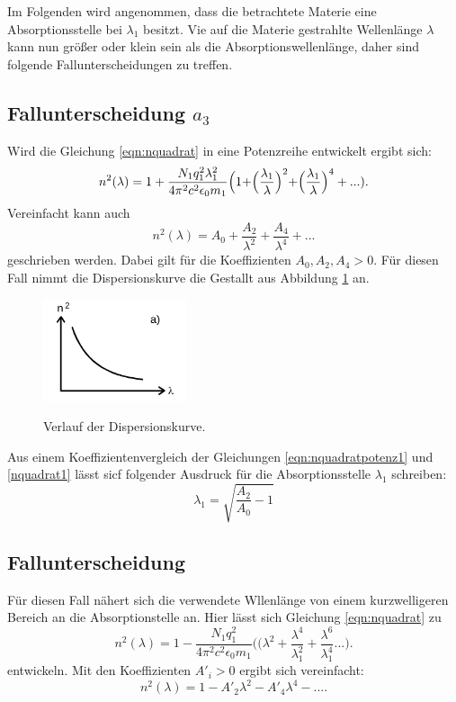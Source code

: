 Im Folgenden wird angenommen, dass die betrachtete Materie eine Absorptionsstelle
bei $\lambda_1$ besitzt. Vie auf die Materie gestrahlte Wellenlänge $\lambda$
kann nun größer oder klein sein als die Absorptionswellenlänge, daher sind
folgende Fallunterscheidungen zu treffen.

\subsection{Fallunterscheidung $a_3$} %
Wird die Gleichung \ref{eqn:nquadrat} in eine Potenzreihe entwickelt ergibt
sich:
\begin{equation}
  n^2(\lambda)=1+\frac{N_1 q^{2}_1 \lambda_{1}^{2}}{4\pi^2c^2\epsilon_0 m_1}
  \Bigr(1+\Bigr(\frac{\lambda_1}{\lambda}\Bigl)^2 +\Bigl(\frac{\lambda_1}{\lambda}\Bigr)^4+...).
  \label{eqn:nquadratpotenz1}
\end{equation}
Vereinfacht kann auch
\begin{equation}
 n^2(\lambda)= A_0+\frac{A_2}{\lambda^2}+\frac{A_4}{\lambda^4}+...
 \label{eqn:nquadrat1}
\end{equation}
geschrieben werden.
Dabei gilt für die Koeffizienten $A_0,A_2,A_4>0$.
Für diesen Fall nimmt die Dispersionskurve die Gestallt aus
Abbildung \ref{fig:krumminnen} an.

\begin{figure}[H]
  \centering
  \includegraphics[height=3cm]{n1.png}
  \caption{Verlauf der Dispersionskurve.}
  \label{fig:krumminnen}
  \cite{skript}
\end{figure}

Aus einem Koeffizientenvergleich der Gleichungen \ref{eqn:nquadratpotenz1}
und \ref{nquadrat1} lässt sicf folgender Ausdruck für die
Absorptionsstelle $\lambda_1$ schreiben:
\begin{equation}
  \lambda_1=\sqrt{\frac{A_2}{A_0}-1}
  \label{absorption}
\end{equation}

\subsection{Fallunterscheidung}%
Für diesen Fall nähert sich die verwendete Wllenlänge von einem kurzwelligeren
Bereich an die Absorptionstelle an. Hier lässt sich Gleichung
\ref{eqn:nquadrat} zu
\begin{equation}
  n^2(\lambda)=1-\frac{N_1 q^{2}_1}{4\pi^2c^2\epsilon_0 m_1}
  \Bigr(\Bigr(\lambda^2+\frac{\lambda^4}{\lambda^{2}_1}+\frac{\lambda^6}{\lambda^{4}_1}...).
  \label{eqn:nquadratpotenz2}
\end{equation}
entwickeln. Mit den Koeffizienten $A'_i>0$ ergibt sich vereinfacht:
\begin{equation}
  n^2(\lambda)=1-A'_2 \lambda^2 -A'_4 \lambda^4-....
  \label{eqn:nquadrat2}
\end{equation}

